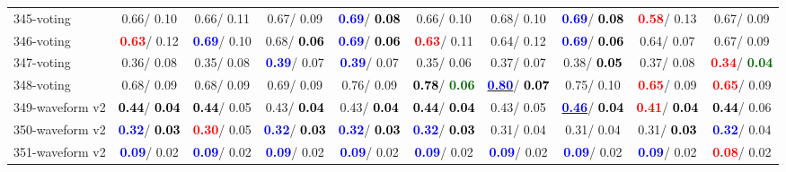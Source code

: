\begin{table}[h]
\begin{center}
{\begin{tabular}{lc|c|c|c|c|c|c|c|c}
345-voting &   0.66/  0.10 &   0.66/  0.11 &   0.67/  0.09 & \textcolor{blue}{\textbf{  0.69}}/\textcolor{black}{\textbf{  0.08}} &   0.66/  0.10 &   0.68/  0.10 & \textcolor{blue}{\textbf{  0.69}}/\textcolor{black}{\textbf{  0.08}} & \textcolor{red}{\textbf{  0.58}}/  0.13 &   0.67/  0.09 \\
346-voting & \textcolor{red}{\textbf{  0.63}}/  0.12 & \textcolor{blue}{\textbf{  0.69}}/  0.10 &   0.68/\textcolor{black}{\textbf{  0.06}} & \textcolor{blue}{\textbf{  0.69}}/\textcolor{black}{\textbf{  0.06}} & \textcolor{red}{\textbf{  0.63}}/  0.11 &   0.64/  0.12 & \textcolor{blue}{\textbf{  0.69}}/\textcolor{black}{\textbf{  0.06}} &   0.64/  0.07 &   0.67/  0.09 \\
347-voting &   0.36/  0.08 &   0.35/  0.08 & \textcolor{blue}{\textbf{  0.39}}/  0.07 & \textcolor{blue}{\textbf{  0.39}}/  0.07 &   0.35/  0.06 &   0.37/  0.07 &   0.38/\textcolor{black}{\textbf{  0.05}} &   0.37/  0.08 & \textcolor{red}{\textbf{  0.34}}/\textcolor{darkgreen}{\textbf{  0.04}} \\
348-voting &   0.68/  0.09 &   0.68/  0.09 &   0.69/  0.09 &   0.76/  0.09 & \textcolor{black}{\textbf{  0.78}}/\textcolor{darkgreen}{\textbf{  0.06}} & \underline{\textcolor{blue}{\textbf{  0.80}}}/\textcolor{black}{\textbf{  0.07}} &   0.75/  0.10 & \textcolor{red}{\textbf{  0.65}}/  0.09 & \textcolor{red}{\textbf{  0.65}}/  0.09 \\ \hline
349-waveform v2 & \textcolor{black}{\textbf{  0.44}}/\textcolor{black}{\textbf{  0.04}} & \textcolor{black}{\textbf{  0.44}}/  0.05 &   0.43/\textcolor{black}{\textbf{  0.04}} &   0.43/\textcolor{black}{\textbf{  0.04}} & \textcolor{black}{\textbf{  0.44}}/\textcolor{black}{\textbf{  0.04}} &   0.43/  0.05 & \underline{\textcolor{blue}{\textbf{  0.46}}}/\textcolor{black}{\textbf{  0.04}} & \textcolor{red}{\textbf{  0.41}}/\textcolor{black}{\textbf{  0.04}} & \textcolor{black}{\textbf{  0.44}}/  0.06 \\
350-waveform v2 & \textcolor{blue}{\textbf{  0.32}}/\textcolor{black}{\textbf{  0.03}} & \textcolor{red}{\textbf{  0.30}}/  0.05 & \textcolor{blue}{\textbf{  0.32}}/\textcolor{black}{\textbf{  0.03}} & \textcolor{blue}{\textbf{  0.32}}/\textcolor{black}{\textbf{  0.03}} & \textcolor{blue}{\textbf{  0.32}}/\textcolor{black}{\textbf{  0.03}} &   0.31/  0.04 &   0.31/  0.04 &   0.31/\textcolor{black}{\textbf{  0.03}} & \textcolor{blue}{\textbf{  0.32}}/  0.04 \\
351-waveform v2 & \textcolor{blue}{\textbf{  0.09}}/  0.02 & \textcolor{blue}{\textbf{  0.09}}/  0.02 & \textcolor{blue}{\textbf{  0.09}}/  0.02 & \textcolor{blue}{\textbf{  0.09}}/  0.02 & \textcolor{blue}{\textbf{  0.09}}/  0.02 & \textcolor{blue}{\textbf{  0.09}}/  0.02 & \textcolor{blue}{\textbf{  0.09}}/  0.02 & \textcolor{blue}{\textbf{  0.09}}/  0.02 & \textcolor{red}{\textbf{  0.08}}/  0.02 \\

\end{tabular}}
\end{center}
\end{table}
